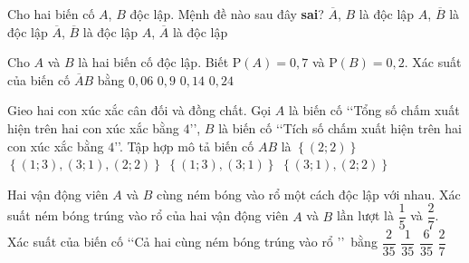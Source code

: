 \begin{ex}%
	Cho hai biến cố $A$, $B$ độc lập. Mệnh đề nào sau đây \textbf{sai}?
	\choice
		{$\overline{A}$, $B$ là độc lập}
		{$A$, $\overline{B}$ là độc lập}
		{$\overline{A}$, $\overline{B}$ là độc lập}
		{\True $A$, $\overline{A}$ là độc lập}
\end{ex}
\begin{ex}%
Cho $A$ và $B$ là hai biến cố độc lập. Biết $\mathrm{P}(A)=0{,}7$ và $\mathrm{P}(B)=0{,}2$. Xác suất của biến cố $\overline{A}B$ bằng
	\choice
		{\True $0{,}06$}
		{$0{,}9$}
		{$0{,}14$}
		{$0{,}24$}
\end{ex}
\begin{ex}%
Gieo hai con xúc xắc cân đối và đồng chất. Gọi $A$ là biến cố \lq\lq Tổng số chấm xuất hiện trên hai con xúc xắc bằng $4$\rq\rq, $B$ là biến cố \lq\lq Tích số chấm xuất hiện trên hai con xúc xắc bằng $4$\rq\rq. Tập hợp mô tả biến cố $AB$ là
	\choice
		{\True $\left\{(2; 2)\right\}$}
		{$\left\{(1; 3), (3; 1), (2; 2)\right\}$}
		{$\left\{(1; 3), (3; 1)\right\}$}
		{$\left\{(3; 1), (2; 2)\right\}$}
\end{ex}
\begin{ex}%
Hai vận động viên $A$ và $B$ cùng ném bóng vào rổ một cách độc lập với nhau. Xác suất ném bóng trúng vào rổ của hai vận động viên $A$ và $B$ lần lượt là $\dfrac{1}{5}$ và $\dfrac{2}{7}$. Xác suất của biến cố \lq\lq Cả hai cùng ném bóng trúng vào rổ \rq\rq \, bằng
	\choice
		{\True $\dfrac{2}{35}$}
		{$\dfrac{1}{35}$}
		{$\dfrac{6}{35}$}
		{$\dfrac{2}{7}$}
\end{ex}
